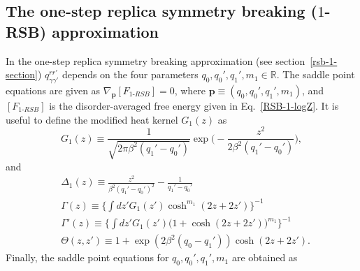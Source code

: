 \documentclass[twocolumn,superscriptaddress,prb,10pt]{revtex4-1}
\begin{document}
\subsection{The one-step replica symmetry breaking ($1$-RSB) approximation}

In the one-step replica symmetry breaking approximation (see section~\ref{rsb-1-section}) 
$q_{\gamma\gamma'}^{rr'}$ depends on the four parameters $q_0,q_0',q_1',m_1\in\mathbb{R}$. 
The saddle point equations are given as $\nabla_{\mathbf{p}}[F_{1\textrm{-}RSB}]=0$, 
where $\mathbf{p}\equiv(q_0,q_0',q_1',m_1)$, and $[F_{1\textrm{-}RSB}]$ is 
the disorder-averaged free energy given in Eq.~\eqref{RSB-1-logZ}.
It is useful to define the modified heat kernel $G_1(z)$ as 
%
\begin{equation}
G_1(z)\equiv\frac{1}{\sqrt{2\pi \beta^2 (q_1'-q_0')}}\exp\Big(-\frac{z^2}
{2\beta^2 (q_1'-q_0')}\Big), 
\end{equation}
%
and 
%
\begin{align}
& \Delta_1(z)\equiv \frac{z^2}{\beta^2(q_1'-q_0')^2}-\frac{1}{q_1'-q_0'}\\\nonumber
& \Gamma(z)\equiv \Big\{\int dz'G_1(z')\cosh^{m_1}(2z+2z')\Big\}^{-1}\\\nonumber
& \Gamma'(z)\equiv \Big\{\int dz'G_1(z')\Big(1+\cosh(2z+2z')\Big)^{m_1}\Big\}^{-1}\\\nonumber
& \Theta(z,z')\equiv 1+\exp(2\beta^2(q_0-q_1'))\cosh(2z+2z'). 
\end{align}
%
Finally, the saddle point equations for $q_0,q_0',q_1',m_1$ are obtained as 
%
\end{document}

